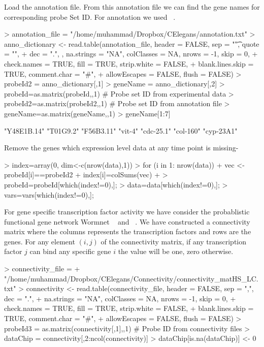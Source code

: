 \documentclass{article}
\begin{document}
Load the annotation file. From this annotation file we can find the gene names for corresponding probe Set ID. For annotation we used ~\cite{celegans:db}.

\begin{Schunk}
\begin{Sinput}
> annotation_file = "/home/muhammad/Dropbox/CElegans/annotation.txt"
> anno_dictionary <- read.table(annotation_file, header = FALSE, sep = "\t", quote = "", 
+                   dec = ".", , na.strings = "NA", colClasses = NA, nrows = -1, skip = 0, 
+                   check.names = TRUE, fill = TRUE, strip.white = FALSE, 
+                   blank.lines.skip = TRUE, comment.char = "#", 
+                   allowEscapes = FALSE, flush = FALSE)
> probeId2 = anno_dictionary[,1]
> geneName = anno_dictionary[,2]
> probeId=as.matrix(probeId,,1) # Probe set ID from experimental data
> probeId2=as.matrix(probeId2,,1) # Probe set ID from annotation file
> geneName=as.matrix(geneName,,1)
> geneName[1:7]
\end{Sinput}
\begin{Soutput}
[1] "Y48E1B.14" "T01G9.2"   "F56B3.11"  "vit-4"     "cdc-25.1"  "col-160"   "cyp-23A1" 
\end{Soutput}
\end{Schunk}

Remove the genes which expression level data at any time point is missing-

\begin{Schunk}
\begin{Sinput}
> index=array(0, dim<-c(nrow(data),1))
> for (i in 1: nrow(data)){
+   vec <- probeId[i]==probeId2
+ 	index[i]=colSums(vec)
+ }
> probeId=probeId[which(index!=0),];
> data=data[which(index!=0),];
> vars=vars[which(index!=0),];
\end{Sinput}
\end{Schunk}

For gene specific transcription factor activity we have consider the probablistic functional gene network Wormnet ~\cite{wormnet:01} and ~\cite{wormnet:02}. We have constructed a connectivity matrix where the columns represents the transcription factors and rows are the genes. For any element $(i,j)$ of the connectivity matrix, if any transcription factor $j$ can bind any specific gene $i$ the value will be one, zero otherwise.

\begin{Schunk}
\begin{Sinput}
> connectivity_file = 
+   "/home/muhammad/Dropbox/CElegans/Connectivity/connectivity_matHS_LC.txt"
> connectivity <- read.table(connectivity_file, header = FALSE, sep = ",", dec = ".", 
+                 na.strings = "NA", colClasses = NA, nrows = -1, skip = 0, 
+                 check.names = TRUE, fill = TRUE, strip.white = FALSE,  
+                 blank.lines.skip = TRUE, comment.char = "#", 
+                 allowEscapes = FALSE, flush = FALSE)
> probeId3 = as.matrix(connectivity[,1],,1) # Probe ID from connectivity files
> dataChip = connectivity[,2:ncol(connectivity)]
> dataChip[is.na(dataChip)] <- 0
\end{Sinput}
\end{Schunk}
\end{document}
